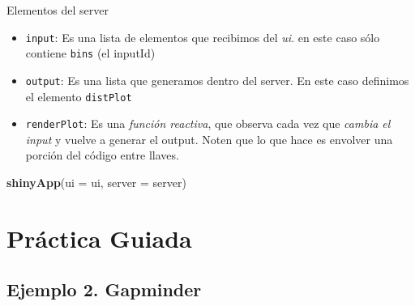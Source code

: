 \documentclass[]{book}
\newenvironment{Shaded}{\begin{snugshade}}{\end{snugshade}}
\newcommand{\ControlFlowTok}[1]{\textcolor[rgb]{0.13,0.29,0.53}{\textbf{#1}}}
\newcommand{\DataTypeTok}[1]{\textcolor[rgb]{0.13,0.29,0.53}{#1}}
\newcommand{\DecValTok}[1]{\textcolor[rgb]{0.00,0.00,0.81}{#1}}
\newcommand{\KeywordTok}[1]{\textcolor[rgb]{0.13,0.29,0.53}{\textbf{#1}}}
\newcommand{\NormalTok}[1]{#1}
\newcommand{\OperatorTok}[1]{\textcolor[rgb]{0.81,0.36,0.00}{\textbf{#1}}}
\newcommand{\StringTok}[1]{\textcolor[rgb]{0.31,0.60,0.02}{#1}}
\providecommand{\tightlist}{%
  \setlength{\itemsep}{0pt}\setlength{\parskip}{0pt}}
\begin{document}
Elementos del server

\begin{itemize}
\tightlist
\item
  \texttt{input}: Es una lista de elementos que recibimos del \emph{ui}. en este caso sólo contiene \texttt{bins} (el inputId)
\item
  \texttt{output}: Es una lista que generamos dentro del server. En este caso definimos el elemento \texttt{distPlot}
\item
  \texttt{renderPlot}: Es una \emph{función reactiva}, que observa cada vez que \emph{cambia el input} y vuelve a generar el output. Noten que lo que hace es envolver una porción del código entre llaves.
\end{itemize}

\begin{Shaded}
\end{Shaded}

\begin{Shaded}
\begin{Highlighting}[]
\KeywordTok{shinyApp}\NormalTok{(}\DataTypeTok{ui =}\NormalTok{ ui, }\DataTypeTok{server =}\NormalTok{ server)}
\end{Highlighting}
\end{Shaded}

\hypertarget{practica-guiada-5}{%
\section{Práctica Guiada}\label{practica-guiada-5}}

\hypertarget{ejemplo-2.-gapminder}{%
\subsection{Ejemplo 2. Gapminder}\label{ejemplo-2.-gapminder}}
\end{document}

